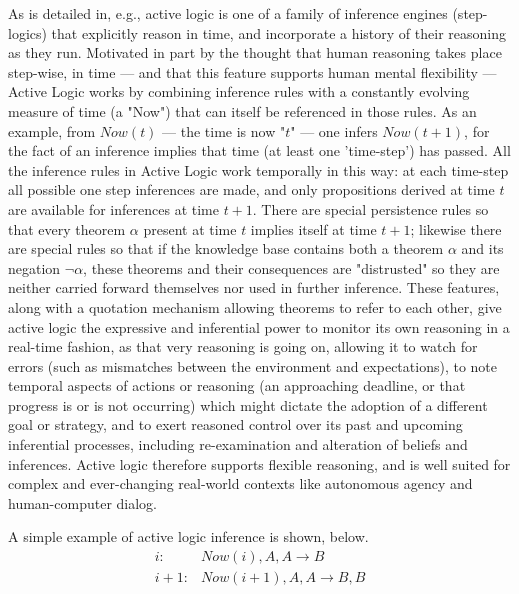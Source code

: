 \documentclass{llncs}
\begin{document}
As is detailed in, e.g.,
\cite{Elgot-etalTR,elgot-drapkin/perlis:reasoning:jetai,Purang-prac99}
active logic is one of a family of inference engines (step-logics) that
explicitly reason in time, and incorporate a history of their reasoning as
they run.  Motivated in part by the thought that human reasoning takes
place step-wise, in time --- and that this feature supports human mental
flexibility --- Active Logic works by combining inference rules with a
constantly evolving measure of time (a "Now") that can itself be referenced
in those rules. As an example, from $\mathit{Now}(t)$ --- the time is now
"$t$" --- one infers $\mathit{Now}(t+1)$, for the fact of an inference
implies that time (at least one 'time-step') has passed.  All the inference
rules in Active Logic work temporally in this way: at each time-step all
possible one step inferences are made, and only propositions derived at
time $t$ are available for inferences at time $t+1$.  There are special
persistence rules so that every theorem $\alpha$ present at time $t$
implies itself at time $t+1$; likewise there are special rules so that if
the knowledge base contains both a theorem $\alpha$ and its negation $\neg
\alpha$, these theorems and their consequences are "distrusted" so they are
neither carried forward themselves nor used in further inference.  These
features, along with a quotation mechanism allowing theorems to refer to
each other, give active logic the expressive and inferential power to
monitor its own reasoning in a real-time fashion, as that very reasoning is
going on, allowing it to watch for errors (such as mismatches between the
environment and expectations), to note temporal aspects of actions or
reasoning (an approaching deadline, or that progress is or is not
occurring) which might dictate the adoption of a different goal or
strategy, and to exert reasoned control over its past and upcoming
inferential processes, including re-examination and alteration of beliefs
and inferences.  Active logic therefore supports flexible reasoning, and is
well suited for complex and ever-changing real-world contexts like
autonomous agency and human-computer dialog.

A simple example of active logic inference is shown, below.
\begin{align*}
  i:   & \mathit{Now}(i),   A, A \rightarrow B \\
  i+1: & \mathit{Now}(i+1), A, A \rightarrow B, B
\end{align*}
 
 
\end{document}
